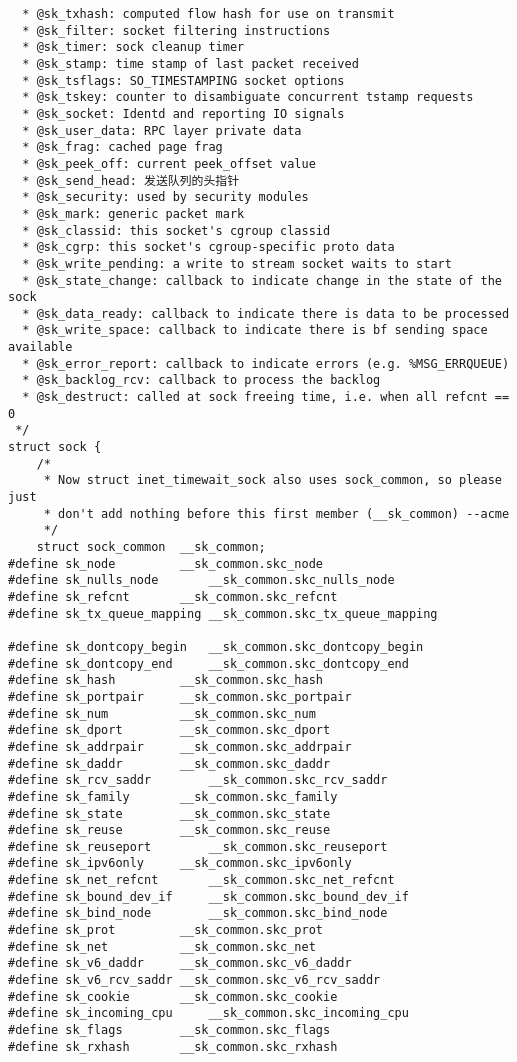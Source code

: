 \begin{verbatim}
  * @sk_txhash: computed flow hash for use on transmit
  * @sk_filter: socket filtering instructions
  * @sk_timer: sock cleanup timer
  * @sk_stamp: time stamp of last packet received
  * @sk_tsflags: SO_TIMESTAMPING socket options
  * @sk_tskey: counter to disambiguate concurrent tstamp requests
  * @sk_socket: Identd and reporting IO signals
  * @sk_user_data: RPC layer private data
  * @sk_frag: cached page frag
  * @sk_peek_off: current peek_offset value
  * @sk_send_head: 发送队列的头指针
  * @sk_security: used by security modules
  * @sk_mark: generic packet mark
  * @sk_classid: this socket's cgroup classid
  * @sk_cgrp: this socket's cgroup-specific proto data
  * @sk_write_pending: a write to stream socket waits to start
  * @sk_state_change: callback to indicate change in the state of the sock
  * @sk_data_ready: callback to indicate there is data to be processed
  * @sk_write_space: callback to indicate there is bf sending space available
  * @sk_error_report: callback to indicate errors (e.g. %MSG_ERRQUEUE)
  * @sk_backlog_rcv: callback to process the backlog
  * @sk_destruct: called at sock freeing time, i.e. when all refcnt == 0
 */
struct sock {
    /*
     * Now struct inet_timewait_sock also uses sock_common, so please just
     * don't add nothing before this first member (__sk_common) --acme
     */
    struct sock_common  __sk_common;
#define sk_node         __sk_common.skc_node
#define sk_nulls_node       __sk_common.skc_nulls_node
#define sk_refcnt       __sk_common.skc_refcnt
#define sk_tx_queue_mapping __sk_common.skc_tx_queue_mapping

#define sk_dontcopy_begin   __sk_common.skc_dontcopy_begin
#define sk_dontcopy_end     __sk_common.skc_dontcopy_end
#define sk_hash         __sk_common.skc_hash
#define sk_portpair     __sk_common.skc_portpair
#define sk_num          __sk_common.skc_num
#define sk_dport        __sk_common.skc_dport
#define sk_addrpair     __sk_common.skc_addrpair
#define sk_daddr        __sk_common.skc_daddr
#define sk_rcv_saddr        __sk_common.skc_rcv_saddr
#define sk_family       __sk_common.skc_family
#define sk_state        __sk_common.skc_state
#define sk_reuse        __sk_common.skc_reuse
#define sk_reuseport        __sk_common.skc_reuseport
#define sk_ipv6only     __sk_common.skc_ipv6only
#define sk_net_refcnt       __sk_common.skc_net_refcnt
#define sk_bound_dev_if     __sk_common.skc_bound_dev_if
#define sk_bind_node        __sk_common.skc_bind_node
#define sk_prot         __sk_common.skc_prot
#define sk_net          __sk_common.skc_net
#define sk_v6_daddr     __sk_common.skc_v6_daddr
#define sk_v6_rcv_saddr __sk_common.skc_v6_rcv_saddr
#define sk_cookie       __sk_common.skc_cookie
#define sk_incoming_cpu     __sk_common.skc_incoming_cpu
#define sk_flags        __sk_common.skc_flags
#define sk_rxhash       __sk_common.skc_rxhash


\end{verbatim}
